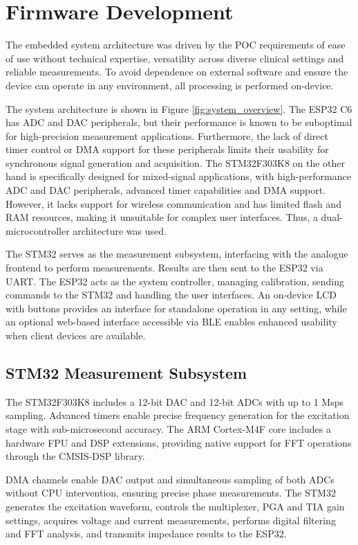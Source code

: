 \section{Firmware Development}
The embedded system architecture was driven by the \ac{POC} requirements of ease of use without technical expertise, versatility across diverse clinical settings and reliable measurements. To avoid dependence on external software and ensure the device can operate in any environment, all processing is performed on-device. 

The system architecture is shown in Figure \ref{fig:system_overview}. The ESP32 C6 has \ac{ADC} and \ac{DAC} peripherals, but their performance is known to be suboptimal for high-precision measurement applications. Furthermore, the lack of direct timer control or \ac{DMA} support for these peripherals limits their usability for synchronous signal generation and acquisition. The STM32F303K8 on the other hand is specifically designed for mixed-signal applications, with high-performance \ac{ADC} and \ac{DAC} peripherals, advanced timer capabilities and \ac{DMA} support. However, it lacks support for wireless communication and has limited flash and RAM resources, making it unsuitable for complex user interfaces. Thus, a dual-microcontroller architecture was used.

The STM32 serves as the measurement subsystem, interfacing with the analogue frontend to perform measurements. Results are then sent to the ESP32 via UART. The ESP32 acts as the system controller, managing calibration, sending commands to the STM32 and handling the user interfaces. An on-device LCD with buttons provides an interface for standalone operation in any setting, while an optional web-based interface accessible via \ac{BLE} enables enhanced usability when client devices are available.

\subsection{STM32 Measurement Subsystem}
The STM32F303K8 includes a 12-bit \ac{DAC} and 12-bit \acp{ADC} with up to 1 Msps sampling. Advanced timers enable precise frequency generation for the excitation stage with sub-microsecond accuracy. The ARM Cortex-M4F core includes a hardware \ac{FPU} and \ac{DSP} extensions, providing native support for \ac{FFT} operations through the CMSIS-DSP library.

\ac{DMA} channels enable \ac{DAC} output and simultaneous sampling of both \acp{ADC} without CPU intervention, ensuring precise phase measurements. The STM32 generates the excitation waveform, controls the multiplexer, \ac{PGA} and \ac{TIA} gain settings, acquires voltage and current measurements, performs digital filtering and \ac{FFT} analysis, and transmits impedance results to the ESP32.

